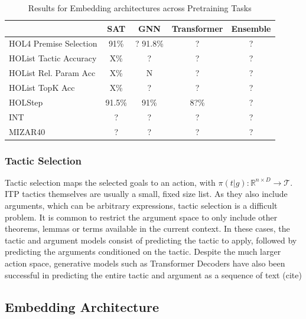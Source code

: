 \documentclass[letterpaper]{article} %
\begin{document}
    \begin{table}[ht]
        \centering
        \begin{tabular}[t]{lcccc}
            \hline
            & SAT    & GNN      & Transformer & Ensemble \\
            \hline
            HOL4 Premise Selection & 91\%   & ? 91.8\% & ?           & ?        \\
            HOList Tactic Accuracy & X\%   & ?        & ?           & ?        \\
            HOList Rel. Param Acc  & X\%   & N        & ?           & ?        \\
            HOList TopK Acc        & X\%   & ?        & ?           & ?        \\
            HOLStep                & 91.5\% & 91\%     & 8?\%        & ?        \\
            INT                    & ?      & ?        & ?           & ?        \\
            MIZAR40                & ?      & ?        & ?           & ?        \\
            \hline
        \end{tabular}
        \caption{Results for Embedding architectures across Pretraining Tasks}
        \label{fig:results}
    \end{table}%

    \subsubsection{Tactic Selection}
    Tactic selection maps the selected goals to an action, with $\pi(t | g) : \mathbb{R}^{n \times D} \to \mathcal{T}$.
    ITP tactics themselves are usually a small, fixed size list.
    As they also include arguments, which can be arbitrary expressions,
    tactic selection is a difficult problem.
    It is common to restrict the argument space to only include other theorems, lemmas or terms available in the current context.
    In these cases, the tactic and argument models consist of predicting the tactic to apply,
    followed by predicting the arguments conditioned on the tactic.
    Despite the much larger action space, generative models such as Transformer Decoders have also been successful in
    predicting the entire tactic and argument as a sequence of text (cite)

    \subsection{Embedding Architecture}
\end{document}
